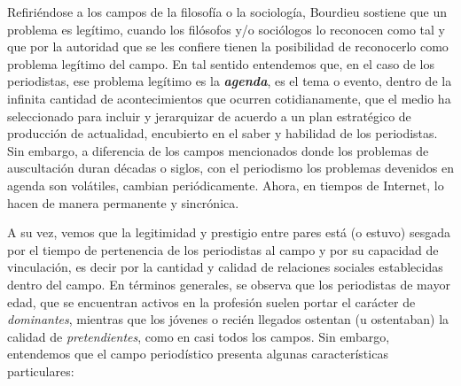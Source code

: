 Refiriéndose a los campos de la filosofía o la sociología, Bourdieu sostiene que un problema es legítimo, cuando los filósofos y/o sociólogos lo reconocen como tal y que por la autoridad que se les confiere tienen la posibilidad de reconocerlo como problema legítimo del campo. En tal sentido entendemos que, en el caso de los periodistas, ese problema legítimo es la \textbf{\emph{agenda}}, es el tema o evento, dentro de la infinita cantidad de acontecimientos que ocurren cotidianamente, que el medio ha seleccionado para incluir y jerarquizar de acuerdo a un plan estratégico de producción de actualidad, encubierto en el saber y habilidad de los periodistas. Sin embargo, a diferencia de los campos mencionados donde los problemas de auscultación duran décadas o siglos, con el periodismo  los problemas devenidos en agenda son volátiles, cambian periódicamente. Ahora, en tiempos de Internet, lo hacen de manera permanente y sincrónica.

A su vez, vemos que la legitimidad y prestigio entre pares está (o estuvo) sesgada por el tiempo de pertenencia de los periodistas al campo y por su capacidad de vinculación, es decir por la cantidad y calidad de relaciones sociales establecidas dentro del campo. En términos generales, se observa que los periodistas de mayor edad, que se encuentran activos en la profesión suelen portar el carácter de \emph{dominantes}, mientras que los jóvenes o recién llegados ostentan (u ostentaban) la calidad de \emph{pretendientes}, como en casi todos los campos. Sin embargo, entendemos que el campo periodístico presenta algunas características particulares:

